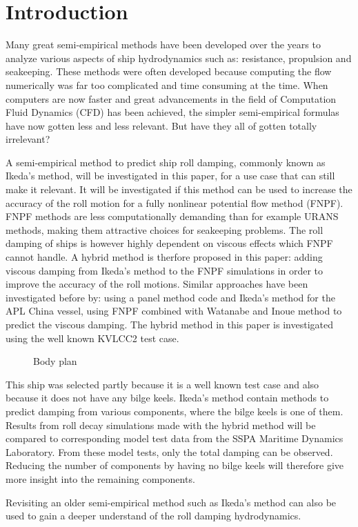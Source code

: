 \section{Introduction}\label{introduction}

Many great semi-empirical methods have been developed over the years to
analyze various aspects of ship hydrodynamics such as: resistance,
propulsion and seakeeping. These methods were often developed because
computing the flow numerically was far too complicated and time
consuming at the time. When computers are now faster and great
advancements in the field of Computation Fluid Dynamics (CFD) has been
achieved, the simpler semi-empirical formulas have now gotten less and
less relevant. But have they all of gotten totally irrelevant?

A semi-empirical method to predict ship roll damping, commonly known as
Ikeda's method, will be investigated in this paper, for a use case that
can still make it relevant. It will be investigated if this method can
be used to increase the accuracy of the roll motion for a fully
nonlinear potential flow method (FNPF). FNPF methods are less
computationally demanding than for example URANS methods, making them
attractive choices for seakeeping problems. The roll damping of ships is
however highly dependent on viscous effects which FNPF cannot handle. A
hybrid method is therfore proposed in this paper: adding viscous damping
from Ikeda's method to the FNPF simulations in order to improve the
accuracy of the roll motions. Similar approaches have been investigated
before by: \cite{7505983/UGK6YEVD} using a panel method code and Ikeda's
method for the APL China vessel, \cite{7505983/24TNAV5Z} using FNPF
combined with Watanabe and Inoue method to predict the viscous damping.
The hybrid method in this paper is investigated using the well known
KVLCC2 test case.
 
            
    
    \begin{figure}
        \begin{center}\end{center}
        \caption{Body plan}
        \label{fig:body_plan}
    \end{figure}
    

    This ship was selected partly because it is a well known test case and
also because it does not have any bilge keels. Ikeda's method contain
methods to predict damping from various components, where the bilge
keels is one of them. Results from roll decay simulations made with the
hybrid method will be compared to corresponding model test data from the
SSPA Maritime Dynamics Laboratory. From these model tests, only the
total damping can be observed. Reducing the number of components by
having no bilge keels will therefore give more insight into the
remaining components.

Revisiting an older semi-empirical method such as Ikeda's method can
also be used to gain a deeper understand of the roll damping
hydrodynamics.

    